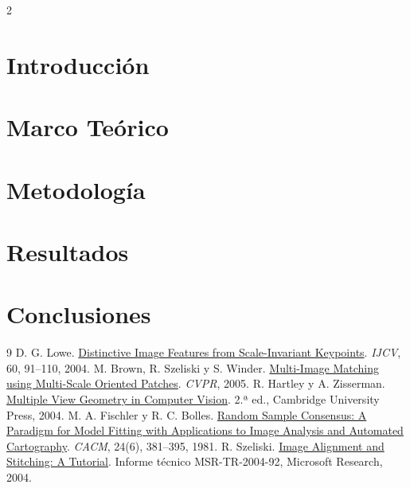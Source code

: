 \documentclass[10pt,a4paper]{article}
\begin{document}
\begin{multicols}{2}

\section{Introducción}

\section{Marco Teórico}

\section{Metodología}

\section{Resultados}

\section{Conclusiones}

\begin{thebibliography}{9}
\footnotesize
{} D. G. Lowe. \href{https://www.cs.ubc.ca/~lowe/papers/ijcv04.pdf}{Distinctive Image Features from Scale-Invariant Keypoints}. \emph{IJCV}, 60, 91--110, 2004.
 M. Brown, R. Szeliski y S. Winder. \href{https://www.microsoft.com/en-us/research/wp-content/uploads/2005/06/cvpr05.pdf}{Multi-Image Matching using Multi-Scale Oriented Patches}. \emph{CVPR}, 2005.
 R. Hartley y A. Zisserman. \href{https://www.robots.ox.ac.uk/~vgg/hzbook/index.html}{Multiple View Geometry in Computer Vision}. 2.ª ed., Cambridge University Press, 2004.
 M. A. Fischler y R. C. Bolles. \href{https://www.sri.com/wp-content/uploads/2021/12/ransac-publication.pdf}{Random Sample Consensus: A Paradigm for Model Fitting with Applications to Image Analysis and Automated Cartography}. \emph{CACM}, 24(6), 381--395, 1981.
 R. Szeliski. \href{https://www.microsoft.com/en-us/research/publication/image-alignment-and-stitching-a-tutorial/}{Image Alignment and Stitching: A Tutorial}. Informe técnico MSR-TR-2004-92, Microsoft Research, 2004.
\end{thebibliography}

\end{multicols}
\end{document}
